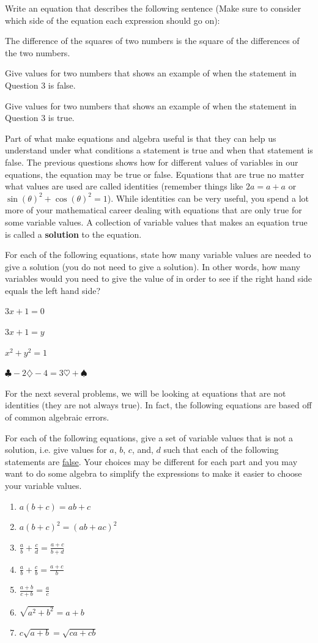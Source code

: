 \bq Write an equation that describes the following sentence (Make sure to consider which side of the equation each expression should go on):

The difference of the squares of two numbers is the square of the differences of the two numbers.
\eq

\bq \be
\item Give values for two numbers that shows an example of when the statement in Question 3 is false.
\item Give values for two numbers that shows an example of when the statement in Question 3 is true.
\ee \eq


Part of what make equations and algebra useful is that they can help us understand under what conditions a statement is true and when that statement is false. The previous questions shows how for different values of variables in our equations, the equation may be true or false. Equations that are true no matter what values are used are called identities (remember things like $2a=a+a$ or $\sin(\theta)^2 +\cos(\theta)^2=1$). While identities can be very useful, you spend a lot more of your mathematical career dealing with equations that are only true for some variable values. A collection of variable values that makes an equation true is called a \textbf{solution} to the equation.

\bq For each of the following equations, state how many variable values are needed to give a solution (you do not need to give a solution). In other words, how many variables would you need to give the value of in order to see if the right hand side equals the left hand side?
\be
\item $3x+1=0$
\item $3x+1=y$
\item $x^2+y^2=1$
\item $\clubsuit-2\diamondsuit-4=3\heartsuit+\spadesuit$
\ee
\eq

For the next several problems, we will be looking at equations that are not identities (they are not always true). In fact, the following equations are based off of common algebraic errors.

\bq For each of the following equations, give a set of variable values that is not a solution, i.e. give values for $a$, $b$, $c$, and, $d$ such that each of the following statements are \underline{false}. Your choices may be different for each part and you may want to do some algebra to simplify the expressions to make it easier to choose your variable values.
\begin{enumerate}
\item $a(b+c)=ab+c$
\item $a(b+c)^2 =(ab+ac)^2$
\item $\frac{a}{b}+\frac{c}{d} =\frac{a+c}{b+d}$
\item $\frac{a}{b}+\frac{c}{b} =\frac{a+c}{b}$
\item $\frac{a+b}{c+b}=\frac{a}{c}$
\item $\sqrt{a^2+b^2}=a+b$
\item $c \sqrt{a+b}=\sqrt{ca+cb}$
\end{enumerate}
\eq

